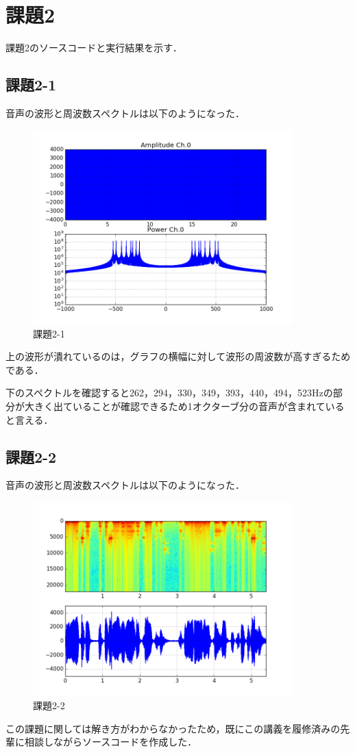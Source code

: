 \section{課題2}
課題2のソースコードと実行結果を示す．


\subsection{課題2-1}

音声の波形と周波数スペクトルは以下のようになった．

\begin{figure}[h]
  \begin{center}
    \includegraphics[width=10cm]{./img/kadai2-1.png}
    \caption{課題2-1}
  \end{center}
\end{figure}

上の波形が潰れているのは，グラフの横幅に対して波形の周波数が高すぎるためである．

下のスペクトルを確認すると262，294，330，349，393，440，494，523Hzの部分が大きく出ていることが確認できるため1オクターブ分の音声が含まれていると言える．


\subsection{課題2-2}


音声の波形と周波数スペクトルは以下のようになった．

\begin{figure}[h]
  \begin{center}
    \includegraphics[width=10cm]{./img/kadai2-2.png}
    \caption{課題2-2}
  \end{center}
\end{figure}

この課題に関しては解き方がわからなかったため，既にこの講義を履修済みの先輩に相談しながらソースコードを作成した．
